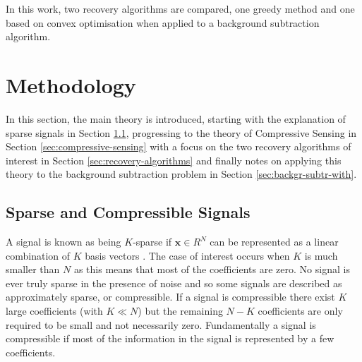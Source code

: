 In this work, two recovery algorithms are compared, one greedy method and one based on convex optimisation when applied to a background subtraction algorithm. 


\section{Methodology}
\label{sec:background}

In this section, the main theory is introduced, starting with the explanation of sparse signals in Section \ref{sec:compressible-signals}, progressing to the theory of Compressive Sensing in Section \ref{sec:compressive-sensing} with a focus on the two recovery algorithms of interest in Section \ref{sec:recovery-algorithms} and finally notes on applying this theory to the background subtraction problem in Section \ref{sec:backgr-subtr-with}.

\subsection{Sparse and Compressible Signals}

\label{sec:compressible-signals}
A signal is known as being $K$-sparse if $\boldsymbol{x} \in R^N$ can be represented as a linear combination of $K$ basis vectors \cite{Baraniuk2007}. The case of interest occurs when $K$ is much smaller than $N$ as this means that most of the coefficients are zero. No signal is ever truly sparse in the presence of noise and so some signals are described as approximately sparse, or compressible. If a signal is compressible there exist $K$ large coefficients (with $K \ll N$) but the remaining $N-K$ coefficients are only required to be small and not necessarily zero. Fundamentally a signal is compressible if most of the information in the signal is represented by a few coefficients.

